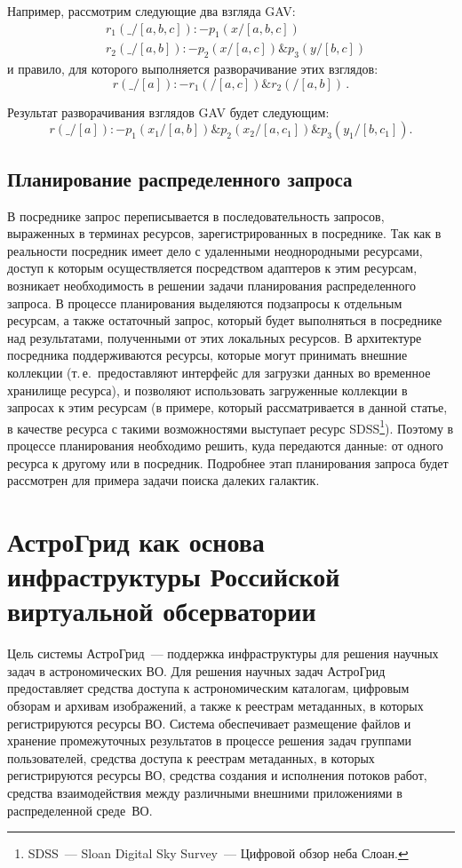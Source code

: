 \begin{multicols}{2}
     Например, рассмотрим следующие два взгляда GAV:
     \begin{align*}
&r_1(\_/[a,b,c]) :- p_1(x/[a,b,c])
\\
&r_2(\_/[a,b]) :- p_2(x/[a,c]) \& p_3(y/[b,c])
\end{align*}
     и правило, для которого выполняется разворачивание этих взглядов:
$$
r(\_/[a]) :- r_1(/[a,c]) \& r_2(/[a,b])\,.
$$

     Результат разворачивания взглядов GAV будет следующим:
$$
r(\_/[a]) :- p_1(x_1/[a,b]) \& p_2(x_2/[a,c_1]) \& p_3(y_1/[b,c_1]).
$$

\subsection{Планирование распределенного запроса}

     В посреднике запрос переписывается в последовательность запросов, выраженных в
терминах ресурсов, зарегистрированных в посреднике. Так как в реальности посредник
имеет дело с удаленными неоднородными ресурсами, доступ к которым осуществляется
посредством адаптеров к этим ресурсам, возникает необходимость в решении задачи
планирования распределенного запроса. В процессе планирования выделяются
подзапросы к отдельным ресурсам, а также остаточный запрос, который будет
выполняться в посреднике над результатами, полученными от этих локальных ресурсов. В
архитектуре посредника поддерживаются ресурсы, которые могут принимать внешние
коллекции (т.\,е.\ предоставляют интерфейс для загрузки данных во временное хранилище
ресурса), и позволяют использовать загруженные коллекции в запросах к этим ресурсам (в
примере, который рассматривается в данной статье, в качестве ресурса с такими
возможностями выступает ресурс SDSS\footnote{SDSS~--- Sloan Digital
Sky Survey~--- Цифровой обзор неба Слоан.}).
Поэтому в процессе планирования необходимо
решить, куда передаются данные: от одного ресурса к другому или в посредник.
Подробнее этап планирования запроса будет рассмотрен для примера задачи поиска
далеких галактик.

\section{АстроГрид как основа инфраструктуры Российской виртуальной обсерватории}

Цель системы АстроГрид~--- поддержка инфраструктуры для решения научных
задач в астрономических ВО. Для решения научных задач
АстроГрид предоставляет средства доступа к астрономическим каталогам, циф\-ро\-вым
обзорам и архивам изображений, а также к реестрам метаданных, в которых
регистрируются ресурсы ВО. Система обеспечивает размещение файлов и хранение
промежуточных результатов  в процессе решения задач группами пользователей, средства
доступа к реестрам метаданных, в которых регистрируются ресурсы ВО, средства
создания и исполнения потоков работ, средства взаимодействия между различными
внешними приложениями в распределенной среде~ВО.


\end{multicols}
